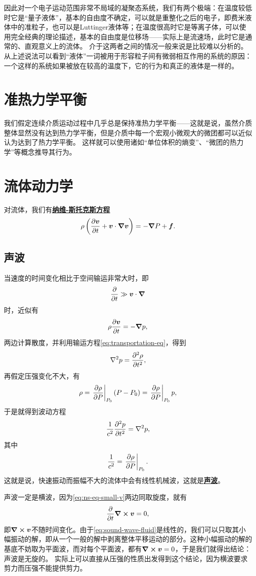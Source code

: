 \documentclass[hyperref, UTF8, a4paper]{ctexart}
\newcommand{\concept}[1]{\underline{\textbf{#1}}}
\begin{document}
因此对一个电子运动范围非常不局域的凝聚态系统，我们有两个极端：在温度较低时它是“量子液体”，基本的自由度不确定，可以就是重整化之后的电子，即费米液体中的准粒子，也可以是Luttinger液体等；在温度很高时它是等离子体，可以使用完全经典的理论描述，基本的自由度是位移场——实际上是流速场，此时它是通常的、直观意义上的流体。
介于这两者之间的情况一般来说是比较难以分析的。从上述说法可以看到“液体”一词被用于形容粒子间有微弱相互作用的系统的原因：一个这样的系统如果被放在较高的温度下，它的行为和真正的液体是一样的。

\section{准热力学平衡}

我们假定连续介质运动过程中几乎总是保持准热力学平衡——这就是说，虽然介质整体显然没有达到热力学平衡，但是介质中每一个宏观小微观大的微团都可以近似认为达到了热力学平衡。
这样就可以使用诸如“单位体积的熵变”、“微团的热力学”等概念推导其行为。

\section{流体动力学}

对流体，我们有\concept{纳维-斯托克斯方程}
\begin{equation}
    \rho \left( \pdv{\vb*{v}}{t} + \vb*{v} \cdot \grad{\vb*{v}} \right) = - \grad{P} + \vb*{f}.
\end{equation}

\subsection{声波}

当速度的时间变化相比于空间输运非常大时，即
\[
    \pdv{t} \gg \vb*{v} \cdot \grad
\]
时，近似有
\begin{equation}
    \rho \pdv{\vb*{v}}{t} = - \grad{p},
    \label{eq:ns-eq-small-v}
\end{equation}
两边计算散度，并利用输运方程\eqref{eq:transportation-eq}，得到
\[
    \laplacian{p} = \pdv[2]{\rho}{t},
\]
再假定压强变化不大，有
\[
    \rho = \eval{\pdv{\rho}{P}}_{P_0} (P - P_0) = \eval{\pdv{\rho}{P}}_{P_0} p,
\]
于是就得到波动方程
\begin{equation}
    \frac{1}{c^2} \pdv[2]{p}{t} = \laplacian{p},
    \label{eq:sound-wave-fluid}
\end{equation}
其中
\begin{equation}
    \frac{1}{c^2} = \eval{\pdv{\rho}{P}}_{P_0}.
\end{equation}
这就是说，快速振动而振幅不大的流体中会有线性机械波，这就是\concept{声波}。

声波一定是横波，因为\eqref{eq:ns-eq-small-v}两边同取旋度，就有
\[
    \pdv{t} \curl{\vb*{v}} = 0, 
\]
即$\curl{\vb*{v}}$不随时间变化。由于\eqref{eq:sound-wave-fluid}是线性的，我们可以只取其小幅振动的解，即从一个一般的解中剥离整体平移运动的部分。这种小幅振动的解的基底不妨取为平面波，而对每个平面波，都有$\curl{\vb*{v}}=0$，于是我们就得出结论：声波是无旋的。
实际上可以直接从压强的性质出发得到这个结论，因为横波要求剪力而压强不能提供剪力。
\end{document}

